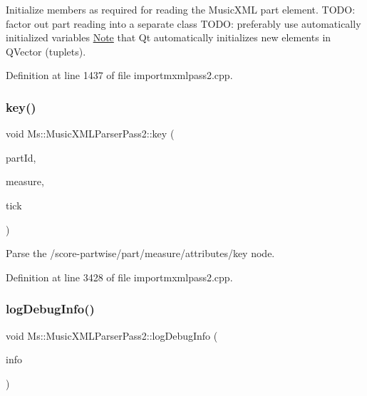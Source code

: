 Initialize members as required for reading the Music\+X\+ML part element. T\+O\+DO\+: factor out part reading into a separate class T\+O\+DO\+: preferably use automatically initialized variables \hyperlink{class_ms_1_1_note}{Note} that Qt automatically initializes new elements in Q\+Vector (tuplets). 

Definition at line 1437 of file importmxmlpass2.\+cpp.

\mbox{\label{class_ms_1_1_music_x_m_l_parser_pass2_ad3b40065fafd611e568675bd30fed307}} 
\subsubsection{\texorpdfstring{key()}{key()}}
{\footnotesize\ttfamily void Ms\+::\+Music\+X\+M\+L\+Parser\+Pass2\+::key (\begin{DoxyParamCaption}\item[{const Q\+String \&}]{part\+Id,  }\item[{\hyperlink{class_ms_1_1_measure}{Measure} $\ast$}]{measure,  }\item[{const int}]{tick }\end{DoxyParamCaption})}

Parse the /score-\/partwise/part/measure/attributes/key node. 

Definition at line 3428 of file importmxmlpass2.\+cpp.

\mbox{\label{class_ms_1_1_music_x_m_l_parser_pass2_a6292f48423d6ed5e2dbcae2b43cf906f}} 
\subsubsection{\texorpdfstring{log\+Debug\+Info()}{logDebugInfo()}}
{\footnotesize\ttfamily void Ms\+::\+Music\+X\+M\+L\+Parser\+Pass2\+::log\+Debug\+Info (\begin{DoxyParamCaption}\item[{const Q\+String \&}]{info }\end{DoxyParamCaption})}

